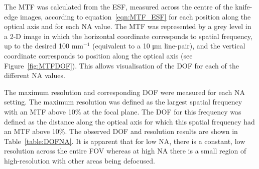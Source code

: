 The MTF was calculated from the ESF, measured across the centre of the knife-edge images, according to equation~\ref{eqn:MTF_ESF} for each position along the optical axis and for each NA value. The MTF was represented by a grey level in a 2-D image in which the horizontal coordinate corresponds to spatial frequency, up to the desired 100 mm$^{-1}$ (equivalent to a 10 \si{\um} line-pair), and the vertical coordinate corresponds to position along the optical axis (see Figure~\ref{fig:MTFDOF}). This allows visualisation of the DOF for each of the different NA values.

The maximum resolution and corresponding DOF were measured for each NA setting. The maximum resolution was defined as the largest spatial frequency with an MTF above 10\% at the focal plane. The DOF for this frequency was defined as the distance along the optical axis for which this spatial frequency had an MTF above 10\%.  
The observed DOF and resolution results are shown in Table~\ref{table:DOFNA}.
It is apparent that for low NA, there is a constant, low resolution across the entire FOV whereas at high NA there is a small region of high-resolution with other areas being defocused. 



